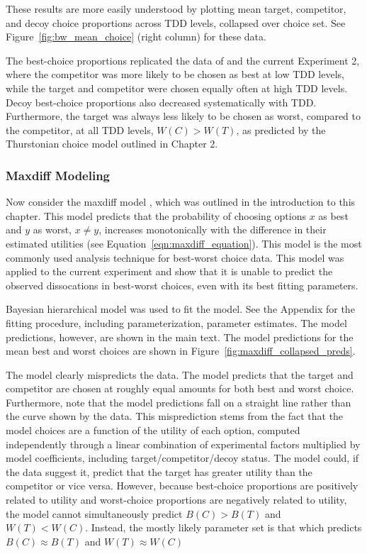 These results are more easily understood by plotting mean target, competitor, and decoy choice proportions across TDD levels, collapsed over choice set. See Figure~\ref{fig:bw_mean_choice} (right column) for these data. 

The best-choice proportions replicated the data of \textcite{spektorWhenGoodLooks2018b} and the current Experiment 2, where the competitor was more likely to be chosen as best at low TDD levels, while the target and competitor were chosen equally often at high TDD levels. Decoy best-choice proportions also decreased systematically with TDD. Furthermore, the target was always less likely to be chosen as worst, compared to the competitor, at all TDD levels, $W(C)>W(T)$, as predicted by the Thurstonian choice model outlined in Chapter 2.

\subsubsection{Maxdiff Modeling}

Now consider the maxdiff model \parencite{marleyProbabilisticModelsBest2005}, which was outlined in the introduction to this chapter. This model predicts that the probability of choosing options $x$ as best and $y$ as worst, $x \neq y$, increases monotonically with the difference in their estimated utilities (see Equation~\ref{eqn:maxdiff_equation}). This model is the most commonly used analysis technique for best-worst choice data. This model was applied to the current experiment and show that it is unable to predict the observed dissocations in best-worst choices, even with its best fitting parameters.

Bayesian hierarchical model was used to fit the model. See the Appendix for the fitting procedure, including parameterization, parameter estimates. The model predictions, however, are shown in the main text. The model predictions for the mean best and worst choices are shown in Figure~\ref{fig:maxdiff_collapsed_preds}.

The model clearly mispredicts the data. The model predicts that the target and competitor are chosen at roughly equal amounts for both best and worst choice. Furthermore, note that the model predictions fall on a straight line rather than the curve shown by the data. This misprediction stems from the fact that the model choices are a function of the utility of each option, computed independently through a linear combination of experimental factors multiplied by model coefficients, including target/competitor/decoy status. The model could, if the data suggest it, predict that the target has greater utility than the competitor or vice versa. However, because best-choice proportions are positively related to utility and worst-choice proportions are negatively related to utility, the model cannot simultaneously predict $B(C)>B(T)$ and $W(T)<W(C)$. Instead, the mostly likely parameter set is that which predicts $B(C) \approx B(T)$ and $W(T) \approx W(C)$

